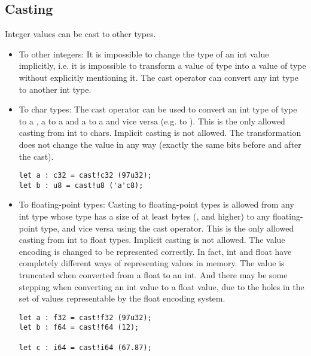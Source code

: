 \subsection{Casting}
\label{sec:orgfdc3d25}

Integer values can be cast to other types.

\begin{itemize}
\item To other integers: It is impossible to change the type of an int value
implicitly, i.e. it is impossible to transform a value of type  into
a value of type  without explicitly mentioning it. The cast operator
 can convert any int type to another int type.


\item To char types: The cast operator can be used to convert an int type of
  type  to a , a  to a  and a
   to a  and vice versa (e.g.  to
  ). This is the only allowed casting from int to chars. Implicit
  casting is not allowed. The transformation does not change the value in any
  way (exactly the same bits before and after the cast).

  \begin{lstlisting}[style=coloredverbatim]
let a : c32 = cast!c32 (97u32);
let b : u8 = cast!u8 ('a'c8);
  \end{lstlisting}

\item To floating-point types: Casting to floating-point types is allowed from
  any int type whose type has a size of at least  bytes (,
   and higher) to any floating-point type, and vice versa using the
  cast operator. This is the only allowed casting from int to float types.
  Implicit casting is not allowed. The value encoding is changed to be
  represented correctly. In fact, int and float have completely different ways
  of representing values in memory. The value is truncated when converted from a
  float to an int. And there may be some stepping when converting an int value
  to a float value, due to the holes in the set of values representable by the
  float encoding system.
  \smallskip

  \begin{lstlisting}[style=coloredverbatim]
let a : f32 = cast!f32 (97u32);
let b : f64 = cast!f64 (12);

let c : i64 = cast!i64 (67.87);
  \end{lstlisting}

\end{itemize}

